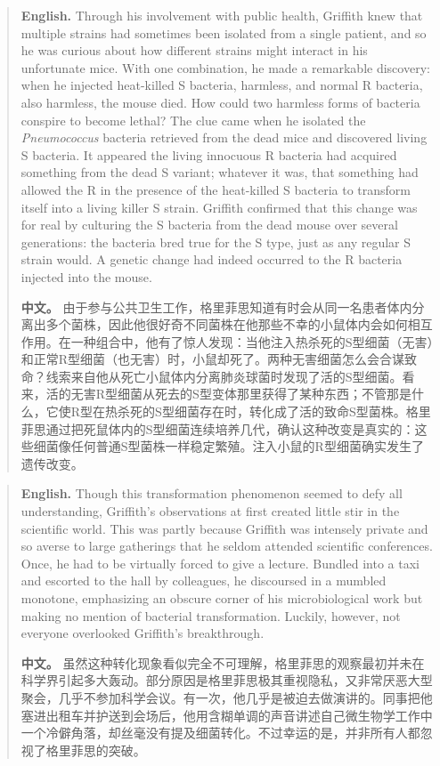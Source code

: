 \begin{quote}
\noindent\textbf{English.} Through his involvement with public health, Griffith knew that multiple strains had sometimes been isolated from a single patient, and so he was curious about how different strains might interact in his unfortunate mice. With one combination, he made a remarkable discovery: when he injected heat-killed S bacteria, harmless, and normal R bacteria, also harmless, the mouse died. How could two harmless forms of bacteria conspire to become lethal? The clue came when he isolated the \emph{Pneumococcus} bacteria retrieved from the dead mice and discovered living S bacteria. It appeared the living innocuous R bacteria had acquired something from the dead S variant; whatever it was, that something had allowed the R in the presence of the heat-killed S bacteria to transform itself into a living killer S strain. Griffith confirmed that this change was for real by culturing the S bacteria from the dead mouse over several generations: the bacteria bred true for the S type, just as any regular S strain would. A genetic change had indeed occurred to the R bacteria injected into the mouse.

\smallskip
\noindent\textbf{中文。} 由于参与公共卫生工作，格里菲思知道有时会从同一名患者体内分离出多个菌株，因此他很好奇不同菌株在他那些不幸的小鼠体内会如何相互作用。在一种组合中，他有了惊人发现：当他注入热杀死的S型细菌（无害）和正常R型细菌（也无害）时，小鼠却死了。两种无害细菌怎么会合谋致命？线索来自他从死亡小鼠体内分离肺炎球菌时发现了活的S型细菌。看来，活的无害R型细菌从死去的S型变体那里获得了某种东西；不管那是什么，它使R型在热杀死的S型细菌存在时，转化成了活的致命S型菌株。格里菲思通过把死鼠体内的S型细菌连续培养几代，确认这种改变是真实的：这些细菌像任何普通S型菌株一样稳定繁殖。注入小鼠的R型细菌确实发生了遗传改变。
\end{quote}

\begin{quote}
\noindent\textbf{English.} Though this transformation phenomenon seemed to defy all understanding, Griffith's observations at first created little stir in the scientific world. This was partly because Griffith was intensely private and so averse to large gatherings that he seldom attended scientific conferences. Once, he had to be virtually forced to give a lecture. Bundled into a taxi and escorted to the hall by colleagues, he discoursed in a mumbled monotone, emphasizing an obscure corner of his microbiological work but making no mention of bacterial transformation. Luckily, however, not everyone overlooked Griffith's breakthrough.

\smallskip
\noindent\textbf{中文。} 虽然这种转化现象看似完全不可理解，格里菲思的观察最初并未在科学界引起多大轰动。部分原因是格里菲思极其重视隐私，又非常厌恶大型聚会，几乎不参加科学会议。有一次，他几乎是被迫去做演讲的。同事把他塞进出租车并护送到会场后，他用含糊单调的声音讲述自己微生物学工作中一个冷僻角落，却丝毫没有提及细菌转化。不过幸运的是，并非所有人都忽视了格里菲思的突破。
\end{quote}

